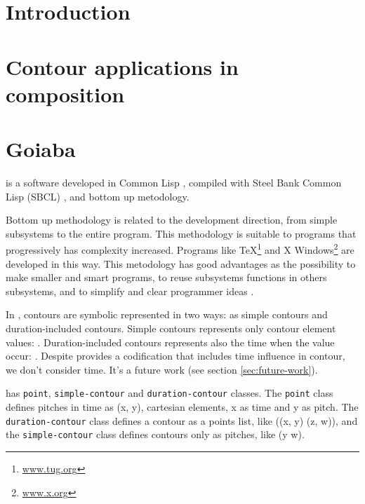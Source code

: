 

\section{Introduction}
\label{sec:introduction}

\section{Contour applications in composition}
\label{sec:cont-appl-comp}

\section{Goiaba}
\label{sec:goiaba}

\goiaba{} is a software developed in Common Lisp \cite{graham94:lisp},
compiled with Steel Bank Common Lisp (SBCL) \cite{team07:sbcl}, and
bottom up metodology.

Bottom up methodology is related to the development direction, from
simple subsystems to the entire program. This methodology is suitable
to programs that progressively has complexity increased. Programs like
\TeX{}\footnote{\url{www.tug.org}} and X
Windows\footnote{\url{www.x.org}} are developed in this way. This
metodology has good advantages as the possibility to make smaller and
smart programs, to reuse subsystems functions in others subsystems,
and to simplify and clear programmer ideas \cite{graham94:lisp}.

In \goiaba{}, contours are symbolic represented in two ways: as simple
contours and duration-included contours. Simple contours represents
only contour element values: . Duration-included
contours represents also the time when the value occur: . Despite \goiaba{} provides a codification that includes
time influence in contour, we don't consider time. It's a future work
(see section \ref{sec:future-work}).

\goiaba{} has \texttt{point}, \texttt{simple-contour} and
\texttt{duration-contour} classes. The \texttt{point} class defines
pitches in time as (x, y), cartesian elements, x as time and y as
pitch. The \texttt{duration-contour} class defines a contour as a
points list, like ((x, y) (z, w)), and the \texttt{simple-contour}
class defines contours only as pitches, like (y w).

